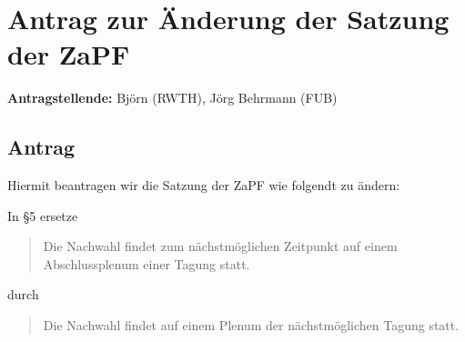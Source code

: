 \documentclass[draft,10pt,oneside]{scrartcl}
\begin{document}
\section*{Antrag zur Änderung der Satzung der ZaPF}

\textbf{Antragstellende:} Björn (RWTH), Jörg Behrmann (FUB)

\subsection*{Antrag}

Hiermit beantragen wir die Satzung der ZaPF wie folgendt zu ändern:

In §5 ersetze
\begin{quote}
    Die Nachwahl findet zum nächstmöglichen Zeitpunkt auf einem Abschlussplenum
    einer Tagung statt.
\end{quote}
durch
\begin{quote}
    Die Nachwahl findet auf einem Plenum der nächstmöglichen Tagung statt.
\end{quote}
\end{document}
